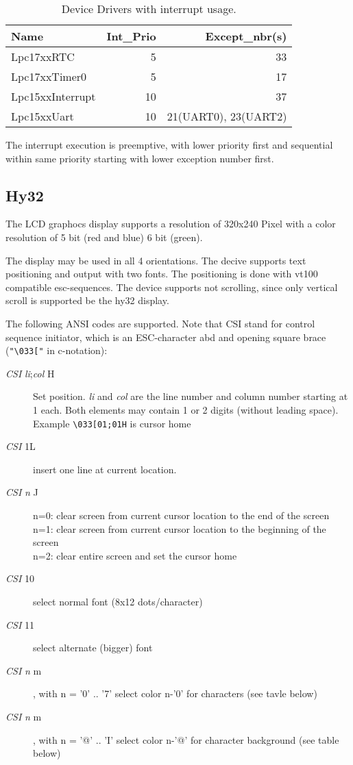 \begin{table}
\begin{tabular}{|l|r|r|}
\hline
Name             & Int\_Prio & Except\_nbr(s) \\
\hline
Lpc17xxRTC       &  5 & 33 \\ 
Lpc17xxTimer0    &  5 &  17 \\
Lpc15xxInterrupt & 10 &  37 \\
Lpc15xxUart      & 10 &  21(UART0), 23(UART2) \\ 
\hline
\end{tabular}
\caption{Device Drivers with interrupt usage.}
\label{lpc17_device_list}
\end{table}

The interrupt execution is preemptive, with lower priority first and 
sequential within same priority starting with lower exception number first.

\subsection{Hy32}
The LCD graphocs display supports a resolution of 320x240 Pixel with
a color resolution of 5 bit (red and blue) 6 bit (green).

The display may be used in all 4 orientations. The decive supports
text positioning and output with two fonts. The positioning is done with
vt100 compatible esc-sequences.
The device supports not scrolling, since only vertical scroll is supported 
be the hy32 display.

The following ANSI codes are supported. Note that CSI stand for
control sequence initiator, which is an ESC-character abd and opening square 
brace (\verb|"\033["| in c-notation):
\begin{description}
\item[{\em CSI}  {\em li};{\em col} H] 
    Set position. {\em li} and {\em col} are the line
    number and column number starting at 1 each. Both elements may contain
    1 or 2 digits (without leading space). Example \verb|\033[01;01H|
 is cursor home
\item[{\em CSI}  1L] insert one line at current location. 
\item[{\em CSI}  {\em n} J] 
n=0: clear screen from current cursor location to the end of the 
    screen
\\
n=1: clear screen from current cursor location to the beginning of the 
    screen
\\
n=2: clear entire screen and set the cursor home
\item[{\em CSI}  10] select normal font (8x12 dots/character) 
\item[{\em CSI}  11] select alternate (bigger) font
\item[{\em CSI}  {\em n} m] , with n = '0' .. '7' select color n-'0' for characters (see tavle below)
\item[{\em CSI}  {\em n} m] , with n = '@' .. 'I' select color n-'@' for character background
(see table below)

\end{description}

